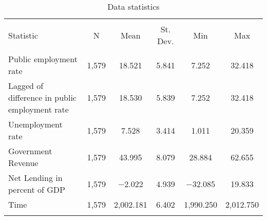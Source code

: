 
\begin{table}[!htbp] \centering 
  \caption{Data statistics} 
  \label{} 
\footnotesize 
\begin{tabular}{@{\extracolsep{5pt}}lccccc} 
\\[-1.8ex]\hline 
\hline \\[-1.8ex] 
Statistic & \multicolumn{1}{c}{N} & \multicolumn{1}{c}{Mean} & \multicolumn{1}{c}{St. Dev.} & \multicolumn{1}{c}{Min} & \multicolumn{1}{c}{Max} \\ 
\hline \\[-1.8ex] 
Public employment rate & 1,579 & 18.521 & 5.841 & 7.252 & 32.418 \\ 
Lagged of difference in public employment rate & 1,579 & 18.530 & 5.839 & 7.252 & 32.418 \\ 
Unemployment rate & 1,579 & 7.528 & 3.414 & 1.011 & 20.359 \\ 
Government Revenue & 1,579 & 43.995 & 8.079 & 28.884 & 62.655 \\ 
Net Lending in percent of GDP & 1,579 & $-$2.022 & 4.939 & $-$32.085 & 19.833 \\ 
Time & 1,579 & 2,002.181 & 6.402 & 1,990.250 & 2,012.750 \\ 
\hline \\[-1.8ex] 
\end{tabular} 
\end{table} 
